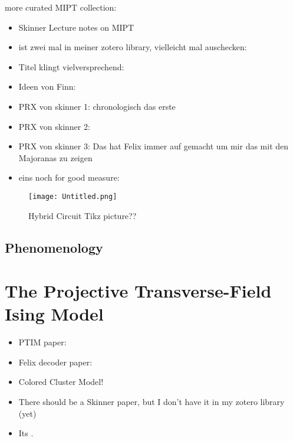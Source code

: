 more curated MIPT collection:
\begin{itemize}
  \item Skinner Lecture notes on MIPT
    \cite{skinnerLectureNotesIntroduction2023}
  \item ist zwei mal in meiner zotero library, vielleicht mal auschecken: 
    \cite{hokeMeasurementinducedEntanglementTeleportation2023}
  \item Titel klingt vielversprechend: \cite{baoTheoryPhaseTransition2020}
  \item Ideen von Finn: \cite{joshiObservingQuantumMpemba2024,aresEntanglementAsymmetryProbe2023}
  \item PRX von skinner 1: \cite{skinnerMeasurementInducedPhaseTransitions2019}
    chronologisch das erste
  \item PRX von skinner 2: \cite{nahumMeasurementEntanglementPhase2021}
  \item PRX von skinner 3:
    \cite{nahumEntanglementDynamicsDiffusionannihilation2020}
    Das hat Felix immer auf gemacht um mir das mit den Majoranas zu zeigen
  \item eins noch for good measure:
    \cite{yoshidaDecodingEntanglementStructure2021}
\end{itemize}
%  
\begin{figure}[H]
  \centering
  \texttt{[image: Untitled.png]}
  \caption{Hybrid Circuit Tikz picture??}
  \label{fig:hybrid-circuit}
\end{figure}

\subsection{Phenomenology}

\section{The Projective Transverse-Field Ising Model}\label{sec:intro-ptim}
\begin{itemize}
  \item PTIM paper: 
    \cite{langEntanglementTransitionProjective2020}
  \item Felix decoder paper: 
    \cite{roserDecodingProjectiveTransverse2023}
  \item Colored Cluster Model!
  \item There should be a Skinner paper, but I don't have it in my zotero
    library (yet)
  \item Its \cite{nahumEntanglementDynamicsDiffusionannihilation2020}.
\end{itemize}

